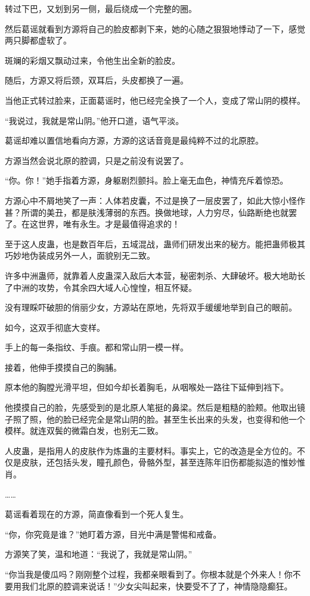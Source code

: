 \begin{this_body}
转过下巴，又划到另一侧，最后绕成一个完整的圈。

然后葛谣就看到方源将自己的脸皮都剥下来，她的心随之狠狠地悸动了一下，感觉两只脚都虚软了。

斑斓的彩烟又飘动过来，令他生出全新的脸皮。

随后，方源又将后颈，双耳后，头皮都换了一遍。

当他正式转过脸来，正面葛谣时，他已经完全换了一个人，变成了常山阴的模样。

“我说过，我就是常山阴。”他开口道，语气平淡。

葛谣却难以置信地看向方源，方源的这话音竟是最纯粹不过的北原腔。

方源当然会说北原的腔调，只是之前没有说罢了。

“你。你！”她手指着方源，身躯剧烈颤抖。脸上毫无血色，神情充斥着惊恐。

方源心中不屑地笑了一声：人体若皮囊，不过是换了一层皮罢了，如此大惊小怪作甚？所谓的美丑，都是肤浅薄弱的东西。换做地球，人力穷尽，仙路断绝也就罢了。在这世界，唯有永生。才是最值得追求的！

至于这人皮蛊，也是数百年后，五域混战，蛊师们研发出来的秘方。能把蛊师极其巧妙地伪装成另外一人，面貌别无二致。

许多中洲蛊师，就靠着人皮蛊深入敌后大本营，秘密刺杀、大肆破坏。极大地助长了中洲的攻势，令其余四大域人心惶惶，相互怀疑。

没有理睬吓破胆的俏丽少女，方源站在原地，先将双手缓缓地举到自己的眼前。

如今，这双手彻底大变样。

手上的每一条指纹、手痕。都和常山阴一模一样。

接着，他伸手摸摸自己的胸脯。

原本他的胸膛光滑平坦，但如今却长着胸毛，从咽喉处一路往下延伸到裆下。

他摸摸自己的脸，先感受到的是北原人笔挺的鼻梁。然后是粗糙的脸颊。他取出镜子照了照，他的脸已经完全是常山阴的脸。甚至生长出来的头发，也变得和他一个模样。就连双鬓的微霜白发，也别无二致。

人皮蛊，是指用人的皮肤作为炼蛊的主要材料。事实上，它的改造是全方位的。不仅是皮肤，还包括头发，瞳孔颜色，骨骼外型，甚至连陈年旧伤都能拟造的惟妙惟肖。

……

葛谣看着现在的方源，简直像看到一个死人复生。

“你，你究竟是谁？”她盯着方源，目光中满是警惕和戒备。

方源笑了笑，温和地道：“我说了，我就是常山阴。”

“你当我是傻瓜吗？刚刚整个过程，我都亲眼看到了。你根本就是个外来人！你不要用我们北原的腔调来说话！”少女尖叫起来，快要受不了了，神情隐隐癫狂。


\end{this_body}
